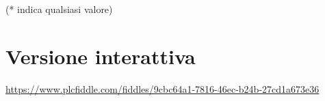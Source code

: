 \documentclass{article}
\begin{document}
    \begin{table}[H]
    \centering
    \end{table}

    (* indica qualsiasi valore)

    \section{Versione interattiva}
    \href{https://www.plcfiddle.com/fiddles/9cbc64a1-7816-46ec-b24b-27cd1a673e36http://www.overleaf.com}{https://www.plcfiddle.com/fiddles/9cbc64a1-7816-46ec-b24b-27cd1a673e36}
\end{document}
